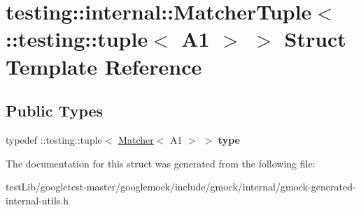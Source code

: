\hypertarget{structtesting_1_1internal_1_1MatcherTuple_3_01_1_1testing_1_1tuple_3_01A1_01_4_01_4}{}\section{testing\+:\+:internal\+:\+:Matcher\+Tuple$<$ \+:\+:testing\+:\+:tuple$<$ A1 $>$ $>$ Struct Template Reference}
\label{structtesting_1_1internal_1_1MatcherTuple_3_01_1_1testing_1_1tuple_3_01A1_01_4_01_4}
\subsection*{Public Types}
\begin{DoxyCompactItemize}
\item 
\mbox{\label{structtesting_1_1internal_1_1MatcherTuple_3_01_1_1testing_1_1tuple_3_01A1_01_4_01_4_a8463ac100366f7e8b6ad1035e42ec4b0}} 
typedef \+::testing\+::tuple$<$ \hyperlink{classtesting_1_1Matcher}{Matcher}$<$ A1 $>$ $>$ {\bfseries type}
\end{DoxyCompactItemize}


The documentation for this struct was generated from the following file\+:\begin{DoxyCompactItemize}
\item 
test\+Lib/googletest-\/master/googlemock/include/gmock/internal/gmock-\/generated-\/internal-\/utils.\+h\end{DoxyCompactItemize}
